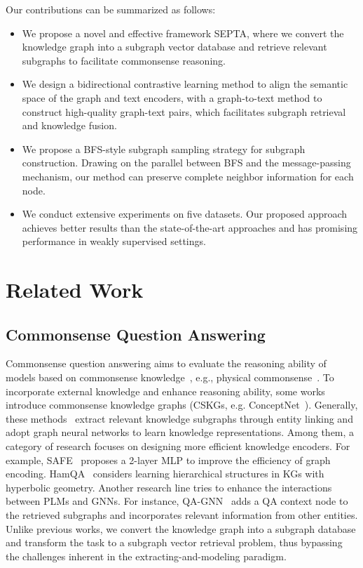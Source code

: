 \documentclass[runningheads]{llncs}
\begin{document}
Our contributions can be summarized as follows:
\begin{itemize}
\item We propose a novel and effective framework SEPTA, where we convert the knowledge graph into a subgraph vector database and retrieve relevant subgraphs to facilitate commonsense reasoning.

\item We design a bidirectional contrastive learning method to align the semantic space of the graph and text encoders, with a graph-to-text method to construct high-quality graph-text pairs, which facilitates subgraph retrieval and knowledge fusion.

\item We propose a BFS-style subgraph sampling strategy for subgraph construction. Drawing on the parallel between BFS and the message-passing mechanism, our method can preserve complete neighbor information for each node.

\item We conduct extensive experiments on five datasets. Our proposed approach achieves better results than the state-of-the-art approaches and has promising performance in weakly supervised settings.

\end{itemize}

\section{Related Work}
\subsection{Commonsense Question Answering}
Commonsense question answering aims to evaluate the reasoning ability of models based on commonsense knowledge~\cite{ref:commonsenseqa}, e.g., physical commonsense~\cite{ref:piqa}. To incorporate external knowledge and enhance reasoning ability, some works introduce commonsense knowledge graphs (CSKGs, e.g. ConceptNet~\cite{ref:cpnet}). Generally, these methods~\cite{ref:qagnn,ref:dgrn,ref:greaselm,ref:jointlk,ref:gsc,ref:safe,ref:dragon,ref:hamqa,ref:dhlk,ref:grape,ref:fits} extract relevant knowledge subgraphs through entity linking and adopt graph neural networks to learn knowledge representations. Among them, a category of research focuses on designing more efficient knowledge encoders. For example, SAFE~\cite{ref:safe} proposes a 2-layer MLP to improve the efficiency of graph encoding. HamQA~\cite{ref:hamqa} considers learning hierarchical structures in KGs with hyperbolic geometry. Another research line tries to enhance the interactions between PLMs and GNNs. For instance, QA-GNN~\cite{ref:qagnn} adds a QA context node to the retrieved subgraphs and incorporates relevant information from other entities. Unlike previous works, we convert the knowledge graph into a subgraph database and transform the task to a subgraph vector retrieval problem, thus bypassing the challenges inherent in the extracting-and-modeling paradigm. 
\end{document}
